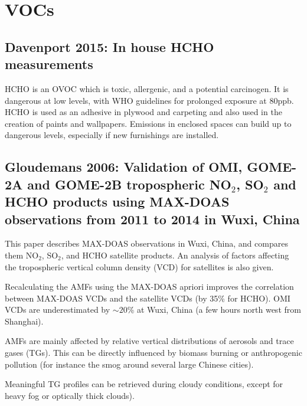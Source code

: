 \documentclass[11pt]{article} %
\begin{document}
      
\section{VOCs}
  
  {\small
  \subsection{Davenport 2015: In house HCHO measurements}
    \citet{Davenport2015}
    HCHO is an OVOC which is toxic, allergenic, and a potential carcinogen. 
    It is dangerous at low levels, with WHO guidelines for prolonged exposure at 80ppb.
    HCHO is used as an adhesive in plywood and carpeting and also used in the creation of paints and wallpapers.
    Emissions in enclosed spaces can build up to dangerous levels, especially if new furnishings are installed.
  } %
  
  \subsection{Gloudemans 2006: Validation of OMI, GOME-2A and GOME-2B tropospheric NO$_2$, SO$_2$ and HCHO products using MAX-DOAS observations from 2011 to 2014 in Wuxi, China}
    \citet{Gloudemans2006}
    
    This paper describes MAX-DOAS observations in Wuxi, China, and compares them NO$_2$, SO$_2$, and HCHO satellite products.
    An analysis of factors affecting the tropospheric vertical column density (VCD) for satellites is also given.
    
    Recalculating the AMFs using the MAX-DOAS apriori improves the correlation between MAX-DOAS VCDs and the satellite VCDs (by 35\% for HCHO). 
    OMI VCDs are underestimated by $\sim20$\% at Wuxi, China (a few hours north west from Shanghai).
    
    AMFs are mainly affected by relative vertical distributions of aerosols and trace gases (TGs).
    This can be directly influenced by biomass burning or anthropogenic pollution (for instance the smog around several large Chinese cities).
    
    Meaningful TG profiles can be retrieved during cloudy conditions, except for heavy fog or optically thick clouds).
    
\end{document}
